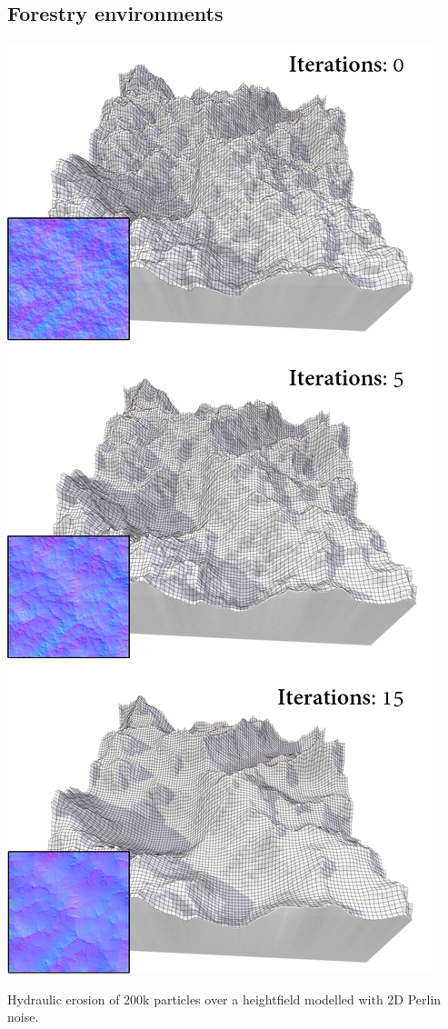 \subsection{Forestry environments}

\begin{marginfigure}[.cm]
    \centering
    \includegraphics[width=\linewidth]{figs/lidar_simulation/erosion.png}
	\caption{Hydraulic erosion of 200k particles over a heightfield modelled with 2D Perlin noise. }
	\label{fig:hydraulic_erosion}
\end{marginfigure}
